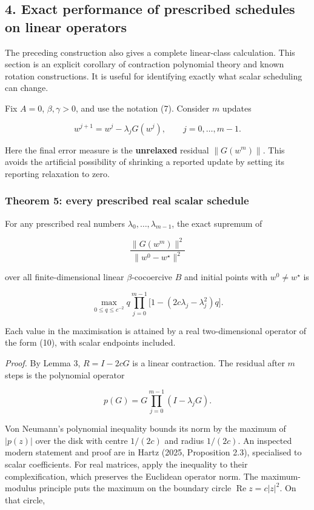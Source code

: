 \documentclass[
  british,
  11pt,
  a4paper,
]{article}
\let\oldsubsection\subsection
\renewcommand{\subsection}{\Needspace{5\baselineskip}\oldsubsection}
\begin{document}
\subsection{4. Exact performance of prescribed schedules on linear
operators}\label{exact-performance-of-prescribed-schedules-on-linear-operators}

The preceding construction also gives a complete linear-class
calculation. This section is an explicit corollary of contraction
polynomial theory and known rotation constructions. It is useful for
identifying exactly what scalar scheduling can change.

Fix \(A=0\), \(\beta,\gamma>0\), and use the notation (7). Consider
\(m\) updates

\[w^{j+1}=w^j-\lambda_jG(w^j),\qquad j=0,\ldots,m-1.\]

Here the final error measure is the \textbf{unrelaxed} residual
\(\|G(w^m)\|\). This avoids the artificial possibility of shrinking a
reported update by setting its reporting relaxation to zero.

\subsubsection{Theorem 5: every prescribed real scalar
schedule}\label{theorem-5-every-prescribed-real-scalar-schedule}

For any prescribed real numbers \(\lambda_0,\ldots,\lambda_{m-1}\), the
exact supremum of

\[\frac{\|G(w^m)\|^2}{\|w^0-w^\star\|^2}\]

over all finite-dimensional linear \(\beta\)-cocoercive \(B\) and
initial points with \(w^0\ne w^\star\) is

\[
\max_{0\leq q\leq c^{-2}}
q\prod_{j=0}^{m-1}\bigl[1-(2c\lambda_j-\lambda_j^2)q\bigr].
\tag{12}
\]

Each value in the maximisation is attained by a real two-dimensional
operator of the form (10), with scalar endpoints included.

\emph{Proof.} By Lemma 3, \(R=I-2cG\) is a linear contraction. The
residual after \(m\) steps is the polynomial operator

\[p(G)=G\prod_{j=0}^{m-1}(I-\lambda_jG).\]

Von Neumann's polynomial inequality bounds its norm by the maximum of
\(|p(z)|\) over the disk with centre \(1/(2c)\) and radius \(1/(2c)\).
An inspected modern statement and proof are in Hartz (2025, Proposition
2.3), specialised to scalar coefficients. For real matrices, apply the
inequality to their complexification, which preserves the Euclidean
operator norm. The maximum-modulus principle puts the maximum on the
boundary circle \(\operatorname{Re}z=c|z|^2\). On that circle,
\end{document}
